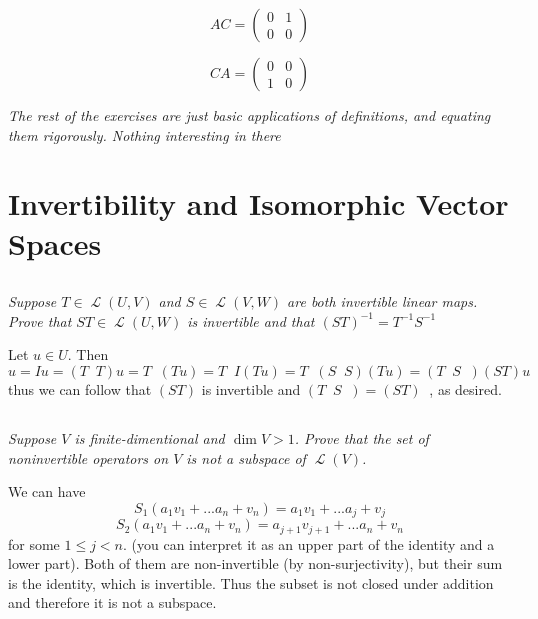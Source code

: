 \documentclass[11pt,oneside,titlepage]{book}
\DeclareMathOperator \map {\mathcal {L}}
\DeclareMathOperator \inv {^{-1}}
\begin{document}
$$AC =
\begin{pmatrix}
  0 & 1 \\
  0 & 0
\end{pmatrix}
$$

$$CA =
\begin{pmatrix}
  0 & 0 \\
  1 & 0
\end{pmatrix}
$$

\textit{The rest of the exercises are just basic applications of definitions, and equating them
  rigorously. Nothing interesting in there}

\section{Invertibility and Isomorphic Vector Spaces}

\subsection{}

\textit{Suppose $T \in \map (U, V)$ and $S \in \map (V, W)$ are both invertible linear maps.
  Prove that $ST \in \map(U, W)$ is invertible and that $(ST)^{-1} = T^{-1} S^{-1}$}

Let $u \in U$. Then
$$u = Iu = (T \inv T) u = T \inv (T u) = T \inv I (T u) = T \inv (S \inv S) (T u) =
(T \inv S \inv) (S T) u $$
thus we can follow that $(ST)$ is invertible and $(T \inv S \inv) = (ST) \inv$, as desired.

\subsection{}

\textit{Suppose $V$ is finite-dimentional and $\dim V > 1$. Prove that the set of
  noninvertible operators on $V$ is not a subspace of $\map(V)$.}

We can have
$$S_1(a_1 v_1 + ... a_n + v_n) = a_1 v_1 + ... a_j + v_j$$
$$S_2(a_1 v_1 + ... a_n + v_n) = a_{j + 1} v_{j + 1} + ... a_n + v_n$$
for some $1 \leq j < n$. (you can interpret it as an upper part of the identity and a lower
part). Both of them are non-invertible (by non-surjectivity), but their sum is the identity,
which is invertible. Thus the subset is not closed under addition and therefore it is not a
subspace.

\subsection{}
\end{document}
